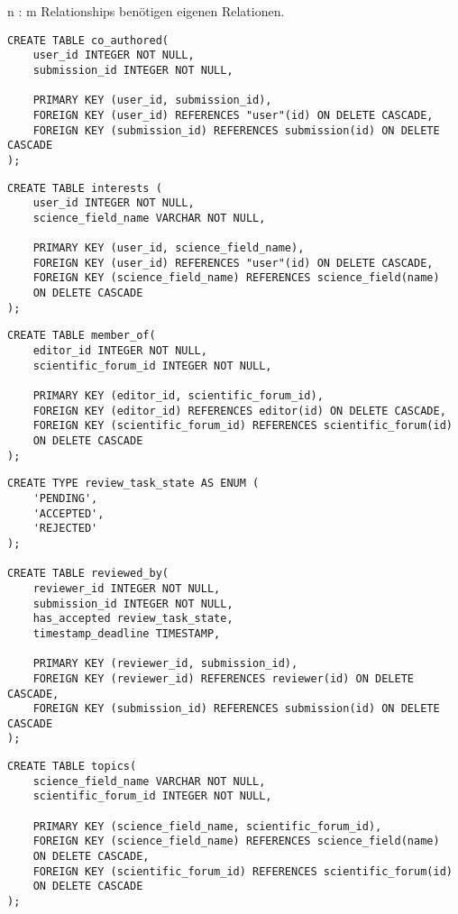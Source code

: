 n : m Relationships benötigen eigenen Relationen.\\

\begin{lstlisting}[caption={DDL der Ko-Autoren}]
CREATE TABLE co_authored(
	user_id INTEGER NOT NULL,
	submission_id INTEGER NOT NULL,

	PRIMARY KEY (user_id, submission_id),
	FOREIGN KEY (user_id) REFERENCES "user"(id) ON DELETE CASCADE,
	FOREIGN KEY (submission_id) REFERENCES submission(id) ON DELETE CASCADE
);
\end{lstlisting}

\begin{lstlisting}[caption={DDL der Interessensgebiete}]
CREATE TABLE interests (
	user_id INTEGER NOT NULL,
	science_field_name VARCHAR NOT NULL,

	PRIMARY KEY (user_id, science_field_name),
	FOREIGN KEY (user_id) REFERENCES "user"(id) ON DELETE CASCADE,
	FOREIGN KEY (science_field_name) REFERENCES science_field(name)
	ON DELETE CASCADE
);
\end{lstlisting}

\begin{lstlisting}[caption={DDL der verwaltenden Editoren}]
CREATE TABLE member_of(
	editor_id INTEGER NOT NULL,
	scientific_forum_id INTEGER NOT NULL,

	PRIMARY KEY (editor_id, scientific_forum_id),
	FOREIGN KEY (editor_id) REFERENCES editor(id) ON DELETE CASCADE,
	FOREIGN KEY (scientific_forum_id) REFERENCES scientific_forum(id)
	ON DELETE CASCADE
);
\end{lstlisting}

\begin{lstlisting}[caption={DDL der begutachtenden Gutachter}]
CREATE TYPE review_task_state AS ENUM (
	'PENDING',
	'ACCEPTED',
	'REJECTED'
);

CREATE TABLE reviewed_by(
	reviewer_id INTEGER NOT NULL,
	submission_id INTEGER NOT NULL,
	has_accepted review_task_state,
	timestamp_deadline TIMESTAMP,

	PRIMARY KEY (reviewer_id, submission_id),
	FOREIGN KEY (reviewer_id) REFERENCES reviewer(id) ON DELETE CASCADE,
	FOREIGN KEY (submission_id) REFERENCES submission(id) ON DELETE CASCADE
);
\end{lstlisting}

\begin{lstlisting}[caption={DDL der Themengebiete eines Forums}]
CREATE TABLE topics(
	science_field_name VARCHAR NOT NULL,
	scientific_forum_id INTEGER NOT NULL,

	PRIMARY KEY (science_field_name, scientific_forum_id),
	FOREIGN KEY (science_field_name) REFERENCES science_field(name)
	ON DELETE CASCADE,
	FOREIGN KEY (scientific_forum_id) REFERENCES scientific_forum(id)
	ON DELETE CASCADE
);
\end{lstlisting}